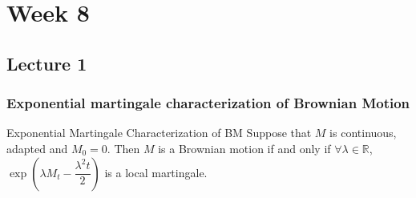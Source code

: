 \documentclass[12pt,a4paper]{article}
\newcommand{\R}{\mathbb{R}}
\begin{document}
\section{Week 8}
\subsection{Lecture 1}
\subsubsection{Exponential martingale characterization of Brownian Motion}
\begin{theorem}{Exponential Martingale Characterization of BM}{}
    Suppose that $M$ is continuous, adapted and $M_0=0$. Then $M$ is a Brownian motion if and only if $\forall \lambda\in \R$, $\exp\left(\lambda M_t -\dfrac{\lambda^2 t}{2}\right)$ is a local martingale.
\end{theorem}
\end{document}
